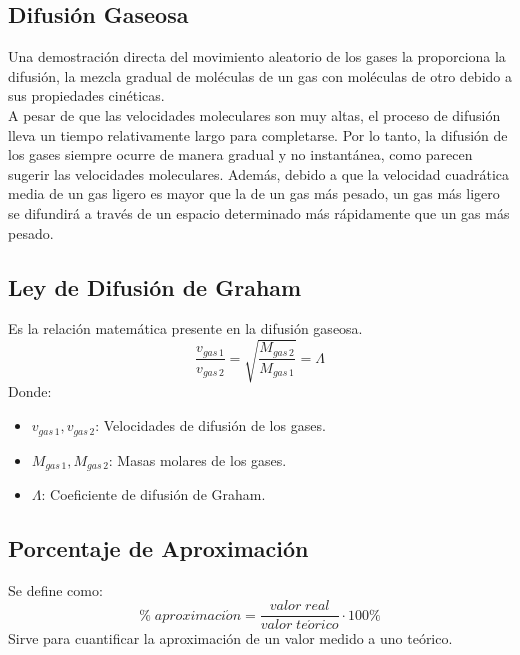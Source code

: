 \documentclass[../main.tex]{subfiles}
\begin{document}
\subsection{Difusión Gaseosa}
Una demostración directa del movimiento aleatorio de los 
gases la proporciona la difusión, la mezcla gradual de moléculas
de un gas con moléculas de otro debido a sus propiedades 
cinéticas. \\
A pesar de que las velocidades moleculares son muy altas, el 
proceso de difusión lleva un tiempo relativamente largo para 
completarse. Por lo tanto, la difusión de los gases 
siempre ocurre de manera gradual y no instantánea, como parecen
sugerir las velocidades moleculares. Además, debido a que 
la velocidad cuadrática media de un gas ligero es mayor que 
la de un gas más pesado,
un gas más ligero se difundirá a través de un 
espacio determinado más rápidamente que un gas más pesado. \cite{chang}

\subsection{Ley de Difusión de Graham}
Es la relación matemática presente en la difusión gaseosa.
\begin{equation} \label{diffusion_eq} 
    \frac{v_{gas\, 1}}{v_{gas\, 2}} =
    \sqrt{\frac{M_{gas\, 2}}{M_{gas\, 1}}} =
    \Lambda
\end{equation}
Donde:
\begin{itemize}
    \item $v_{gas\, 1}, v_{gas\, 2}$: Velocidades de difusión de los gases.
    \item $M_{gas\, 1}, M_{gas\, 2}$: Masas molares de los gases.
    \item $\Lambda$: Coeficiente de difusión de Graham.
\end{itemize}

\subsection{Porcentaje de Aproximación}
Se define como:
\[ \% \; aproximaci\acute{o}n = \frac{valor\; real}{valor\; te\acute{o}rico} \cdot 100\%\]
Sirve para cuantificar la aproximación de un valor medido a uno teórico.
\end{document}
